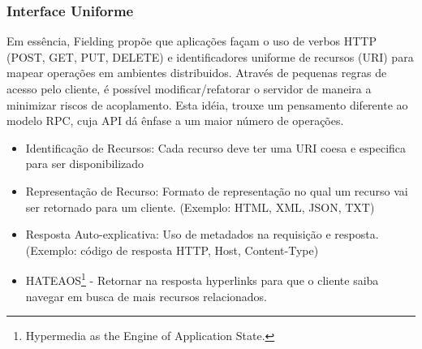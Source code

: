 \subsubsection[Interface Uniforme]{Interface Uniforme}

Em essência, Fielding propõe que aplicações façam o uso de verbos HTTP (POST, GET, PUT, DELETE) e identificadores uniforme de recursos (URI) para mapear operações em ambientes distribuidos. Através de pequenas regras de acesso pelo cliente, é possível modificar/refatorar o servidor de maneira a minimizar riscos de acoplamento. Esta idéia, trouxe um pensamento diferente ao modelo RPC, cuja API dá ênfase a um maior número de operações. \cite{Fielding2000}

\begin{itemize}[noitemsep]
\item Identificação de Recursos: Cada recurso deve ter uma URI coesa e especifica para ser disponibilizado
\item Representação de Recurso: Formato de representação no qual um recurso vai ser retornado para um cliente. (Exemplo: HTML, XML, JSON, TXT)
\item Resposta Auto-explicativa: Uso de metadados na requisição e resposta. (Exemplo: código de resposta HTTP, Host, Content-Type)
\item HATEAOS\footnote{
  Hypermedia as the Engine of Application State.
} - Retornar na resposta hyperlinks para que o cliente saiba navegar em busca de mais recursos relacionados.
\end{itemize}
